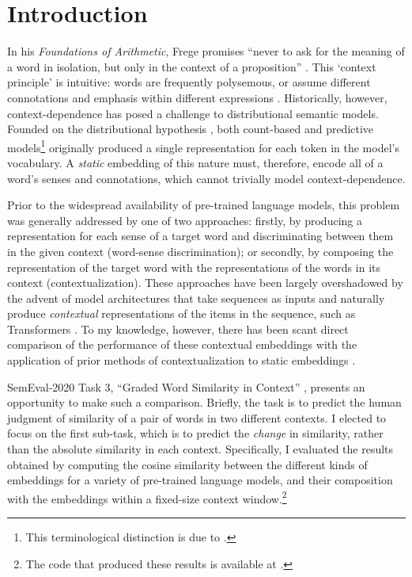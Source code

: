 \section{Introduction}
\label{sec:introduction}

In his \emph{Foundations of Arithmetic}, Frege promises ``never to ask for the meaning
of a word in isolation, but only in the context of a proposition''
\parencites*[xvii]{Frege1960}.
This `context principle' is intuitive: words are frequently polysemous, or assume
different connotations and emphasis within different expressions
\parencites[2-3]{Armendariz2020}.
Historically, however, context-dependence has posed a challenge to distributional
semantic models.
Founded on the distributional hypothesis \parencites[e.g.][142-143]{Turney2010}, both
count-based and predictive models\footnote{This terminological distinction is due to
  \textcites{Baroni2014a}.
} originally
produced a single representation for each token in the model's vocabulary.
A \emph{static} embedding of this nature must, therefore, encode all of a word's senses
and connotations, which cannot trivially model context-dependence.

Prior to the widespread availability of pre-trained language models, this problem was
generally addressed by one of two approaches: firstly, by producing a representation
for each sense of a target word and discriminating between them in the given context
(word-sense discrimination); or secondly, by composing the representation of the target
word with the representations of the words in its context (contextualization).
These approaches have been largely overshadowed by the advent of model architectures
that take sequences as inputs and naturally produce \emph{contextual} representations
of the items in the sequence, such as Transformers \parencites{Vaswani2017}.
To my knowledge, however, there has been scant direct comparison of the performance of
these contextual embeddings with the application of prior methods of contextualization
to static embeddings \parencites[see][]{Milajevs2014}.

SemEval-2020 Task 3, ``Graded Word Similarity in Context''
\parencites{Armendariz2020a}, presents an opportunity to make such a comparison.
Briefly, the task is to predict the human judgment of similarity of a pair of words in
two different contexts.
I elected to focus on the first sub-task, which is to predict the \emph{change} in
similarity, rather than the absolute similarity in each context.
Specifically, I evaluated the results obtained by computing the cosine similarity
between the different kinds of embeddings for a variety of pre-trained language models,
and their composition with the embeddings within a fixed-size context
window.\footnote{The code that produced these results is available at
  .
}

